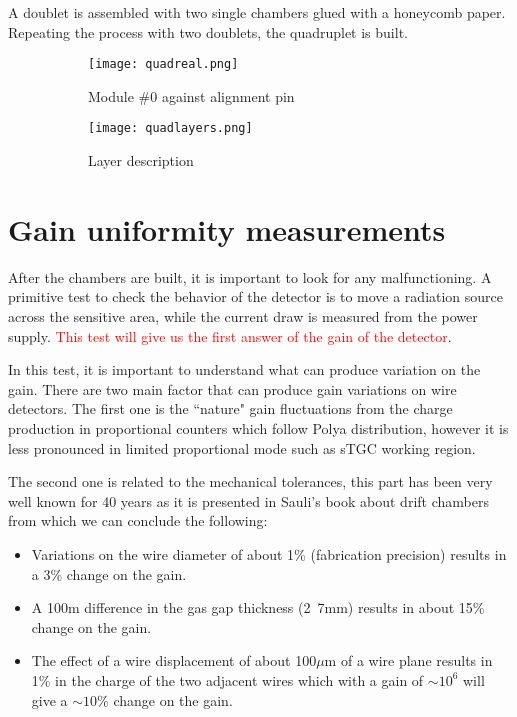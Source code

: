 A doublet is assembled with two single chambers glued with a honeycomb paper. Repeating the process with two doublets,
the quadruplet is built.
\begin{figure}[ht]
\centering
\hspace*{\fill}
{\begin{subfigure}[b]{0.55\textwidth}
\texttt{[image: quadreal.png]}
\caption{Module \#0 against alignment pin}\label{}
\end{subfigure}
}\hfill
{\begin{subfigure}[b]{0.35\textwidth}
\texttt{[image: quadlayers.png]}
\caption{Layer description}\label{quad}
\end{subfigure}
}\hspace*{\fill}
\caption{}
\end{figure}


\section{Gain uniformity measurements}

After the chambers are built, it is important to look for any malfunctioning. A primitive test to check the behavior of
the detector is to move a radiation source across the sensitive area, while the current draw is measured from the
power supply.\textcolor{red}{ This test will give us the first answer of the gain of the detector}.\par

In this test, it is important to understand what can produce variation on the gain. There are two main factor that can
produce gain variations on wire detectors. The first one is the ``nature" gain fluctuations from the charge production
in proportional counters which follow Polya distribution, however it is less pronounced in limited proportional mode such
as sTGC working region.\par

The second one is related to the mechanical tolerances, this part has been very well known for 40 years as it is
presented in
Sauli's book \cite{sauli} about drift chambers from which we can conclude the following:
\begin{itemize}
\item Variations on the wire diameter of about 1\% (fabrication precision) results in a 3\% change on the gain.
\item A \unit{100}{\micro m} difference in the gas gap thickness (\unit{2.7}{mm}) results in about 15\% change on the gain.
\item The effect of a wire displacement of about \unit{100}{$\mu$m}
of a wire plane results in 1\% in the charge of the two adjacent wires which with a gain of $\sim10^6$ will give a
$\sim10\%$ change on the gain.
\end{itemize}


